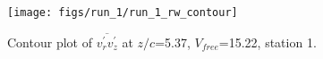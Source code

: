 \begin{figure}[H]
\centering
\texttt{[image: figs/run\_1/run\_1\_rw\_contour]}
\caption{Contour plot of $\overline{v_{r}^{\prime} v_{z}^{\prime}}$ at $z/c$=5.37, $V_{free}$=15.22, station 1.}
\label{fig:run_1_rw_contour}
\end{figure}


